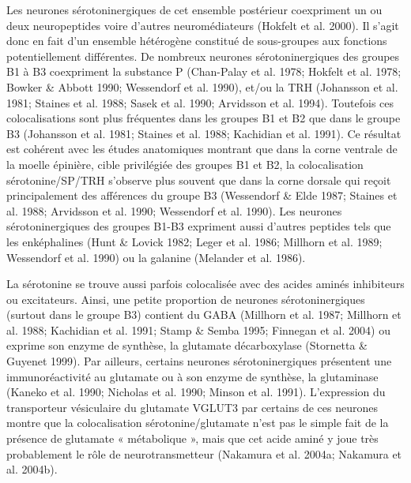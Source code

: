 \documentclass[a4paper,12pt,twoside]{report}
\begin{document}
Les neurones sérotoninergiques de cet ensemble postérieur coexpriment un ou deux neuropeptides voire d’autres neuromédiateurs (Hokfelt et al. 2000). Il s’agit donc en fait d’un ensemble hétérogène constitué de sous-groupes aux fonctions potentiellement différentes. De nombreux neurones sérotoninergiques des groupes B1 à B3 coexpriment la substance P (Chan-Palay et al. 1978; Hokfelt et al. 1978; Bowker \& Abbott 1990; Wessendorf et al. 1990), et/ou la TRH (Johansson et al. 1981; Staines et al. 1988; Sasek et al. 1990; Arvidsson et al. 1994). Toutefois ces colocalisations sont plus fréquentes dans les groupes B1 et B2 que dans le groupe B3 (Johansson et al. 1981; Staines et al. 1988; Kachidian et al. 1991). Ce résultat est cohérent avec les études anatomiques montrant que dans la corne ventrale de la moelle épinière, cible privilégiée des groupes B1 et B2, la colocalisation sérotonine/SP/TRH s’observe plus souvent que dans la corne dorsale qui reçoit principalement des afférences du groupe B3 (Wessendorf \& Elde 1987; Staines et al. 1988; Arvidsson et al. 1990; Wessendorf et al. 1990). Les neurones sérotoninergiques des groupes B1-B3 expriment aussi d’autres peptides tels que les enképhalines (Hunt \& Lovick 1982; Leger et al. 1986; Millhorn et al. 1989; Wessendorf et al. 1990) ou la galanine (Melander et al. 1986). 

La sérotonine se trouve aussi parfois colocalisée avec des acides aminés inhibiteurs ou excitateurs. Ainsi, une petite proportion de neurones sérotoninergiques (surtout dans le groupe B3) contient du GABA (Millhorn et al. 1987; Millhorn et al. 1988; Kachidian et al. 1991; Stamp \& Semba 1995; Finnegan et al. 2004) ou exprime son enzyme de synthèse, la glutamate décarboxylase (Stornetta \& Guyenet 1999). Par ailleurs, certains neurones sérotoninergiques présentent une immunoréactivité au glutamate ou à son enzyme de synthèse, la glutaminase (Kaneko et al. 1990; Nicholas et al. 1990; Minson et al. 1991). L’expression du transporteur vésiculaire du glutamate VGLUT3 par certains de ces neurones montre que la colocalisation sérotonine/glutamate n’est pas le simple fait de la présence de glutamate « métabolique », mais que cet acide aminé y joue très probablement le rôle de neurotransmetteur (Nakamura et al. 2004a; Nakamura et al. 2004b).
\end{document}
